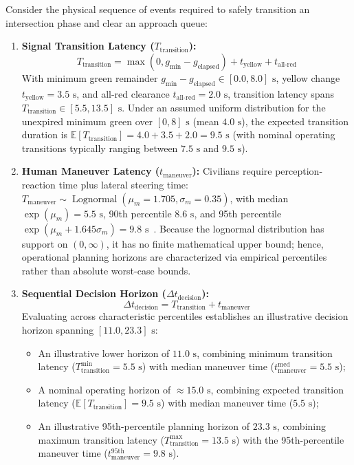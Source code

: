 \documentclass[journal,10pt,twocolumn]{IEEEtran}
\begin{document}
Consider the physical sequence of events required to safely transition an intersection phase and clear an approach queue:
\begin{enumerate}
    \item \textbf{Signal Transition Latency ($T_{\text{transition}}$):}
    \begin{equation}
    T_{\text{transition}} = \max(0, g_{\min} - g_{\text{elapsed}}) + t_{\text{yellow}} + t_{\text{all-red}}
    \end{equation}
    With minimum green remainder $g_{\min} - g_{\text{elapsed}} \in [0.0, 8.0]\text{ s}$, yellow change $t_{\text{yellow}} = 3.5\text{ s}$, and all-red clearance $t_{\text{all-red}} = 2.0\text{ s}$, transition latency spans $T_{\text{transition}} \in [5.5, 13.5]\text{ s}$. Under an assumed uniform distribution for the unexpired minimum green over $[0, 8]\text{ s}$ (mean $4.0\text{ s}$), the expected transition duration is $\mathbb{E}[T_{\text{transition}}] = 4.0 + 3.5 + 2.0 = 9.5\text{ s}$ (with nominal operating transitions typically ranging between $7.5\text{ s}$ and $9.5\text{ s}$).
    \item \textbf{Human Maneuver Latency ($t_{\text{maneuver}}$):} Civilians require perception-reaction time plus lateral steering time: $T_{\text{maneuver}} \sim \operatorname{Lognormal}(\mu_m = 1.705, \sigma_m = 0.35)$, with median $\exp(\mu_m) = 5.5\text{ s}$, 90th percentile $8.6\text{ s}$, and 95th percentile $\exp(\mu_m + 1.645\sigma_m) = 9.8\text{ s}$~\cite{nhtsa2009}. Because the lognormal distribution has support on $(0, \infty)$, it has no finite mathematical upper bound; hence, operational planning horizons are characterized via empirical percentiles rather than absolute worst-case bounds.
    \item \textbf{Sequential Decision Horizon ($\Delta t_{\text{decision}}$):}
    \begin{equation}
    \Delta t_{\text{decision}} = T_{\text{transition}} + t_{\text{maneuver}}
    \end{equation}
    Evaluating across characteristic percentiles establishes an illustrative decision horizon spanning $[11.0, 23.3]\text{ s}$:
    \begin{itemize}
        \item An illustrative lower horizon of $11.0\text{ s}$, combining minimum transition latency ($T_{\text{transition}}^{\min} = 5.5\text{ s}$) with median maneuver time ($t_{\text{maneuver}}^{\text{med}} = 5.5\text{ s}$);
        \item A nominal operating horizon of $\approx 15.0\text{ s}$, combining expected transition latency ($\mathbb{E}[T_{\text{transition}}] = 9.5\text{ s}$) with median maneuver time ($5.5\text{ s}$);
        \item An illustrative 95th-percentile planning horizon of $23.3\text{ s}$, combining maximum transition latency ($T_{\text{transition}}^{\max} = 13.5\text{ s}$) with the 95th-percentile maneuver time ($t_{\text{maneuver}}^{\text{95th}} = 9.8\text{ s}$).
    \end{itemize}
\end{enumerate}
\end{document}
